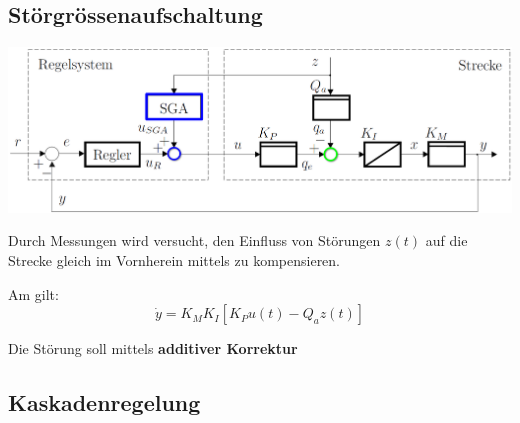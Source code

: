 \subsection{Störgrössenaufschaltung}

\begin{minipage}[c]{0.55\columnwidth}
    \includegraphics[width=\columnwidth]{images/stoergroessenaufschaltung.png}
\end{minipage}
\hfill
\begin{minipage}[c]{0.43\columnwidth}
    Durch Messungen wird versucht, den Einfluss von Störungen $z(t)$ auf die Strecke gleich im Vornherein mittels 
     zu kompensieren.
\end{minipage}

\begin{minipage}[t]{0.48\columnwidth}
    Am  gilt:
    $$ \dot{y} = K_M K_I [K_P u(t) - Q_a z(t)] $$

    Die Störung soll mittels \textbf{additiver Korrektur}
\end{minipage}
\hfill
\begin{minipage}[t]{0.48\columnwidth}
    
\end{minipage}


\subsection{Kaskadenregelung}

% 

